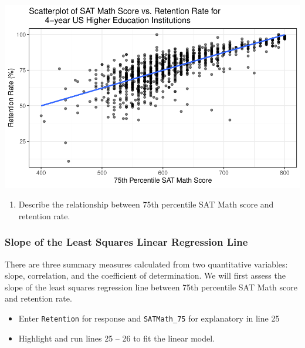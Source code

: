 \documentclass[
]{report}
\newenvironment{Shaded}{\begin{snugshade}}{\end{snugshade}}
\newcommand{\AttributeTok}[1]{\textcolor[rgb]{0.13,0.29,0.53}{#1}}
\newcommand{\CommentTok}[1]{\textcolor[rgb]{0.56,0.35,0.01}{\textit{#1}}}
\newcommand{\DecValTok}[1]{\textcolor[rgb]{0.00,0.00,0.81}{#1}}
\newcommand{\FunctionTok}[1]{\textcolor[rgb]{0.13,0.29,0.53}{\textbf{#1}}}
\newcommand{\NormalTok}[1]{#1}
\newcommand{\OtherTok}[1]{\textcolor[rgb]{0.56,0.35,0.01}{#1}}
\newcommand{\SpecialCharTok}[1]{\textcolor[rgb]{0.81,0.36,0.00}{\textbf{#1}}}
\providecommand{\tightlist}{%
  \setlength{\itemsep}{0pt}\setlength{\parskip}{0pt}}
\begin{document}
\begin{center}\includegraphics[width=0.7\linewidth]{13-A27-EDA-two-quantitative-corr_files/figure-latex/unnamed-chunk-2-1} \end{center}

\begin{enumerate}
\def\labelenumi{\arabic{enumi}.}
\tightlist
\item
  Describe the relationship between 75th percentile SAT Math score and retention rate.
\end{enumerate}

\vspace{1in}

\subsubsection*{Slope of the Least Squares Linear Regression Line}\label{slope-of-the-least-squares-linear-regression-line}

There are three summary measures calculated from two quantitative variables: slope, correlation, and the coefficient of determination. We will first assess the slope of the least squares regression line between 75th percentile SAT Math score and retention rate.

\begin{itemize}
\item
  Enter \texttt{Retention} for response and \texttt{SATMath\_75} for explanatory in line 25
\item
  Highlight and run lines 25 -- 26 to fit the linear model.
\end{itemize}

\begin{Shaded}
\end{Shaded}
\end{document}
